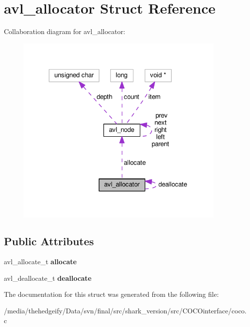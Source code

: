 \hypertarget{structavl__allocator}{}\section{avl\+\_\+allocator Struct Reference}
\label{structavl__allocator}


Collaboration diagram for avl\+\_\+allocator\+:\nopagebreak
\begin{figure}[H]
\begin{center}
\leavevmode
\includegraphics[width=294pt]{structavl__allocator__coll__graph}
\end{center}
\end{figure}
\subsection*{Public Attributes}
\begin{DoxyCompactItemize}
\item 
avl\+\_\+allocate\+\_\+t {\bfseries allocate}\hypertarget{structavl__allocator_a0468dc3f3c0f91deca973c635843b7fd}{}\label{structavl__allocator_a0468dc3f3c0f91deca973c635843b7fd}

\item 
avl\+\_\+deallocate\+\_\+t {\bfseries deallocate}\hypertarget{structavl__allocator_ac9a561a04b993eb4d14d163632a19ad3}{}\label{structavl__allocator_ac9a561a04b993eb4d14d163632a19ad3}

\end{DoxyCompactItemize}


The documentation for this struct was generated from the following file\+:\begin{DoxyCompactItemize}
\item 
/media/thehedgeify/\+Data/svn/final/src/shark\+\_\+version/src/\+C\+O\+C\+Ointerface/coco.\+c\end{DoxyCompactItemize}
